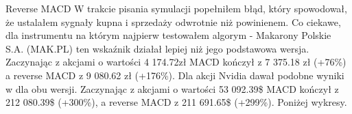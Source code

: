 \documentclass{article}
\begin{document}
\begin{section}{Reverse MACD}
    W trakcie pisania symulacji popełniłem błąd, który spowodował, że ustalałem sygnały kupna i sprzedaży odwrotnie niż powinienem. Co ciekawe, dla instrumentu
    na którym najpierw testowałem algorym - Makarony Polskie S.A. (MAK.PL) ten wskaźnik działał lepiej niż jego podstawowa wersja. Zaczynając z akcjami o wartości 4 174.72zł 
    MACD kończył z 7 375.18 zł (+76\%) a reverse MACD z 9 080.62 zł (+176\%). Dla akcji Nvidia dawał podobne wyniki w dla obu wersji. 
    Zaczynając z akcjami o wartości 53 092.39\$ MACD kończył z 212 080.39\$ (+300\%), 
    a reverse MACD z 211 691.65\$ (+299\%). Poniżej wykresy.
    \begin{figure}[H]
        \centering
    \end{figure}
    \begin{figure}[H]

\end{figure}
\end{section}
\end{document}
